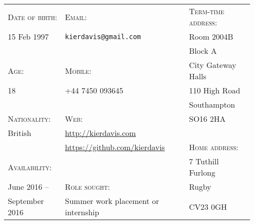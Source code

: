 \hrulefill
\vspace{1em}

{
\newcommand{\h}[1]{\textsc{#1}:}
\newcommand{\n}[1]{\hspace{.8em} #1}
\begin{tabu} to \textwidth {X[1.3,l] X[2.5,l] X[1.5,l]}
    \h{Date of birth}  & \h{Email}                                 & \h{Term-time address}  \\
    \n{15 Feb 1997}    & \n{\texttt{kierdavis@gmail.com}}          & \n{Room 2004B}         \\
                       &                                           & \n{Block A}            \\
    \h{Age}            & \h{Mobile}                                & \n{City Gateway Halls} \\
    \n{18}             & \n{+44 7450 093645}                       & \n{110 High Road}      \\
                       &                                           & \n{Southampton}        \\
    \h{Nationality}    & \h{Web}                                   & \n{SO16 2HA}           \\
    \n{British}        & \n{\url{http://kierdavis.com}}            &                        \\
                       & \n{\url{https://github.com/kierdavis}}    & \h{Home address}       \\
    \h{Availability}   &                                           & \n{7 Tuthill Furlong}  \\
    \n{June 2016 --}   & \h{Role sought}                           & \n{Rugby}              \\
    \n{September 2016} & \n{Summer work placement or internship}   & \n{CV23 0GH}           \\
\end{tabu}
}

\vspace{1em}
\hrulefill
